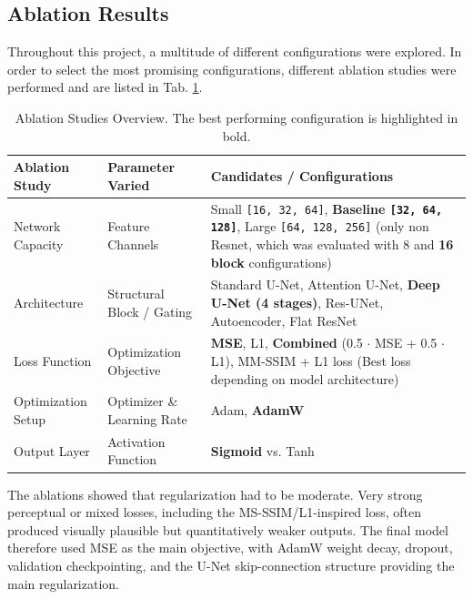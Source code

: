 \documentclass[a4paper,10pt]{article}
\begin{document}
\subsection{Ablation Results}
Throughout this project, a multitude of different configurations were explored. In order to select the most promising configurations, different ablation studies were performed and are listed in Tab. \ref{tab:ablations}.
\begin{table}[H]
\centering
\small %
\setlength{\aboverulesep}{2pt} %
\setlength{\belowrulesep}{2pt} %
\caption{Ablation Studies Overview. The best performing configuration is highlighted in bold.}
\label{tab:ablations}
\begin{tabular}{llp{8.5cm}} %
\toprule
\textbf{Ablation Study} & \textbf{Parameter Varied} & \textbf{Candidates / Configurations} \\
\midrule
Network Capacity & Feature Channels & Small \texttt{[16, 32, 64]}, \textbf{Baseline \texttt{[32, 64, 128]}}, Large \texttt{[64, 128, 256]} (only non Resnet, which was evaluated with 8 and \textbf{16 block} configurations) \\
\midrule
Architecture & Structural Block / Gating & Standard U-Net, Attention U-Net, \textbf{Deep U-Net (4 stages)}, Res-UNet, Autoencoder, Flat ResNet \\
\midrule
Loss Function & Optimization Objective & \textbf{MSE}, L1, \textbf{Combined} (0.5 $\cdot$ MSE + 0.5 $\cdot$ L1), MM-SSIM + L1 loss \cite{Zhaoetal2017} (Best loss depending on model architecture)\\
\midrule
Optimization Setup & Optimizer \& Learning Rate & Adam, \textbf{AdamW} \\
\midrule
Output Layer & Activation Function & \textbf{Sigmoid} vs. Tanh \\
\bottomrule
\end{tabular}
\end{table}



The ablations showed that regularization had to be moderate. Very strong perceptual 
or mixed losses, including the MS-SSIM/L1-inspired loss, often produced visually 
plausible but quantitatively weaker outputs. The final model therefore used MSE as 
the main objective, with AdamW weight decay, dropout, validation checkpointing, and 
the U-Net skip-connection structure providing the main regularization.
\end{document}
